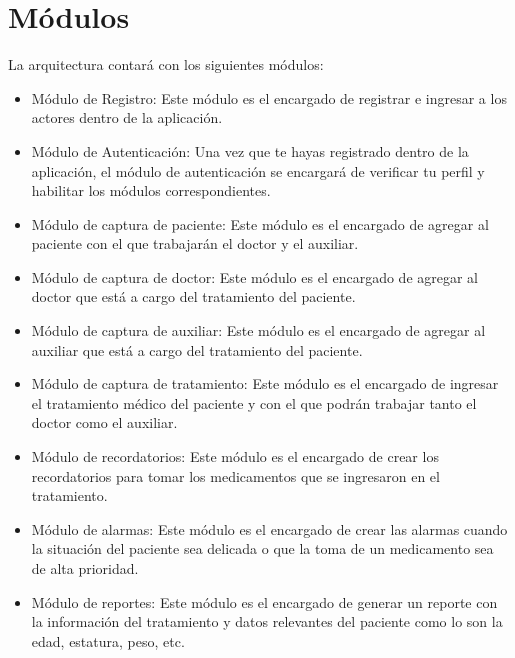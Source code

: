 \section{Módulos}
La arquitectura contará con los siguientes módulos:
\begin{itemize}
	\item Módulo de Registro: Este módulo es el encargado de registrar e ingresar a los actores dentro de la aplicación. 
	
	
	\item Módulo de Autenticación: Una vez que te hayas registrado dentro de la aplicación, el módulo de autenticación se encargará de verificar tu perfil y habilitar los módulos correspondientes.
	
	 
	\item Módulo de captura de paciente: Este módulo es el encargado de agregar al paciente con el que trabajarán el doctor y el auxiliar.
	
	\item Módulo de captura de doctor: Este módulo es el encargado de agregar al doctor que está a cargo del tratamiento del paciente.
	
	\item Módulo de captura de auxiliar: Este módulo es el encargado de agregar al auxiliar que está a cargo del tratamiento del paciente.
	
	\item Módulo de captura de tratamiento: Este módulo es el encargado de ingresar el tratamiento médico del paciente y con el que podrán trabajar tanto el doctor como el auxiliar. 
	
	\item Módulo de recordatorios: Este módulo es el encargado de crear los recordatorios para tomar los medicamentos que se ingresaron en el tratamiento.
	
	\item Módulo de alarmas: Este módulo es el encargado de crear las alarmas cuando la situación del paciente sea delicada o que la toma de un medicamento sea de alta prioridad.
	
	\item Módulo de reportes: Este módulo es el encargado de generar un reporte con la información del tratamiento y datos relevantes del paciente como lo son la edad, estatura, peso, etc.
	
	
	
	
	

\end{itemize}
